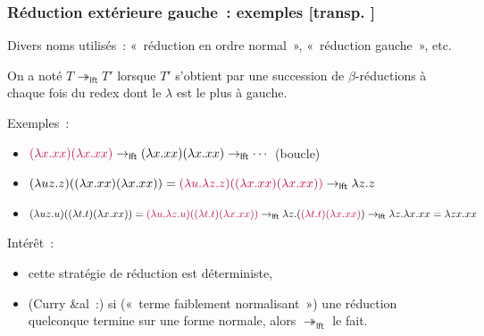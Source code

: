 \documentclass[mathserif,a4paper,aspectratio=169]{beamer}
\renewcommand{\frametitle}[1]{\subsubsection*{#1 {\footnotesize[transp. \insertframenumber]}}}
\begin{document}
\begin{frame}
\frametitle{Réduction extérieure gauche : exemples}

{\footnotesize Divers noms utilisés : « réduction en ordre normal »,
  « réduction gauche », etc.\par}

\bigskip

On a noté $T \twoheadrightarrow_{\mathsf{lft}} T'$ lorsque $T'$
s'obtient par une succession de $\beta$-réductions à chaque fois du
redex dont le $\lambda$ est le plus à gauche.

\bigskip

Exemples :
\begin{itemize}
\item $\textcolor{purple}{(\lambda x.xx)(\lambda x.xx)}
  \rightarrow_{\mathsf{lft}} (\lambda x.xx)(\lambda x.xx)
  \rightarrow_{\mathsf{lft}} \cdots$ (boucle)
\item $(\lambda uz.z)((\lambda x.xx)(\lambda x.xx)) =
  \textcolor{purple}{(\lambda u.\lambda z.z)((\lambda x.xx)(\lambda
    x.xx))} \rightarrow_{\mathsf{lft}} \lambda z.z$
\item $(\lambda uz.u)((\lambda t.t)(\lambda x.xx)) =
  \textcolor{purple}{(\lambda u.\lambda z.u)((\lambda t.t)(\lambda
    x.xx))} \rightarrow_{\mathsf{lft}} \lambda
  z.(\textcolor{purple}{(\lambda t.t)(\lambda x.xx)})
  \rightarrow_{\mathsf{lft}} \lambda z.\lambda x.xx = \lambda zx.xx$
\end{itemize}

\bigskip

Intérêt :
\begin{itemize}
\item cette stratégie de réduction est \alert{déterministe},
\item (Curry \&al :) si (« terme faiblement normalisant ») une
  réduction quelconque termine sur une forme normale, alors
  $\twoheadrightarrow_{\mathsf{lft}}$ le fait.
\end{itemize}

\end{frame}
%
\end{document}
